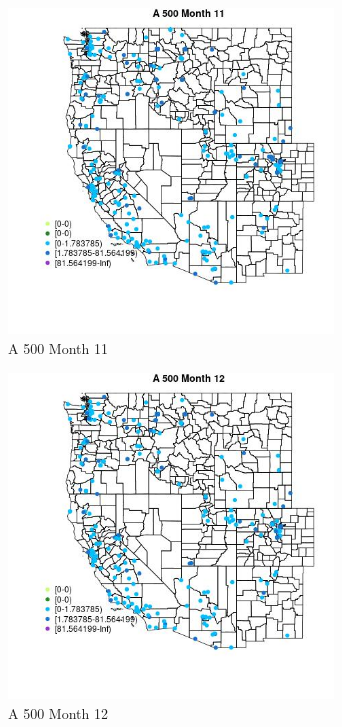 \begin{figure} 
\centering  
\includegraphics[width=0.77\textwidth]{Code_Outputs/Report_ML_input_PM25_Step4_part_e_de_duplicated_aveswNAs_MapObsMo11A_500.jpg} 
\caption{\label{fig:Report_ML_input_PM25_Step4_part_e_de_duplicated_aveswNAsMapObsMo11A_500}A 500 Month 11} 
\end{figure} 
 

\begin{figure} 
\centering  
\includegraphics[width=0.77\textwidth]{Code_Outputs/Report_ML_input_PM25_Step4_part_e_de_duplicated_aveswNAs_MapObsMo12A_500.jpg} 
\caption{\label{fig:Report_ML_input_PM25_Step4_part_e_de_duplicated_aveswNAsMapObsMo12A_500}A 500 Month 12} 
\end{figure} 
 

